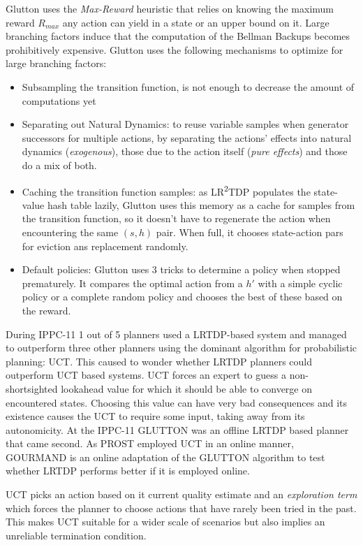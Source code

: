 \documentclass[runningheads,a4paper]{llncs}
\begin{document}
Glutton uses the \emph{Max-Reward} heuristic that relies on knowing the maximum reward $R_{max}$ any action can yield in a state or an upper bound on it. Large branching factors induce that the computation of the Bellman Backups becomes prohibitively expensive. Glutton uses the following mechanisms to optimize for large branching factors:

\begin{itemize}
	\item Subsampling the transition function, is not enough to decrease the amount of computations yet
	\item Separating out Natural Dynamics: to reuse variable samples when generator successors for multiple actions, by separating the actions' effects into natural dynamics (\emph{exogenous}), those due to the action itself (\emph{pure effects}) and those do a mix of both.
	\item Caching the transition function samples: as LR\textsuperscript{2}TDP populates the state-value hash table lazily, Glutton uses  this memory as a cache for samples from the transition function, so it doesn't have to regenerate the action when encountering the same $(s,h)$ pair. When full, it chooses state-action pars for eviction ans replacement randomly.
	\item Default policies: Glutton uses 3 tricks to determine a policy when stopped prematurely. It compares the optimal action from a $h'$ with a simple cyclic policy or a complete random policy and chooses the best of these based on the reward.
\end{itemize}
During IPPC-11 1 out of 5 planners used a LRTDP-based system and managed to outperform three other planners using the dominant algorithm for probabilistic planning: UCT. This caused to wonder whether LRTDP planners could outperform UCT based systems.  UCT forces an expert to guess a non-shortsighted lookahead value for which it should be able to converge on encountered states. Choosing this value can have very bad consequences and its existence causes the UCT to require some input, taking away from its autonomicity. At the IPPC-11 GLUTTON was an offline LRTDP based planner that came second. As PROST employed UCT in an online manner, GOURMAND is an online adaptation of the GLUTTON algorithm to test whether LRTDP performs better if it is employed online.

UCT picks an action based on it current quality estimate and an \emph{exploration term} which forces the planner to choose actions that have rarely been tried in the past. This makes UCT suitable for a wider scale of scenarios but also implies an unreliable termination condition.
\end{document}
